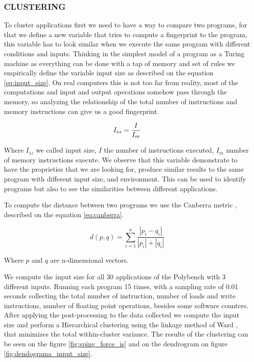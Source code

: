 \subsubsection{CLUSTERING}

To cluster applications first we need to have a way to compare two programs, for that we define a new variable that tries to compute a fingerprint to the program, this variable has to look similar when we execute the same program with different conditions and inputs. Thinking in the simplest model of a program as a Turing machine as everything can be done with a tap of memory and set of rules we empirically define the variable input size as described on the equation \ref{eq:input_size}. On real computers this is not too far from reality, most of the computations and input and output operations somehow pass through the memory, so analyzing the relationship of the total number of instructions and memory instructions can give us a good fingerprint.

\begin{equation}
	I_{sz} = \frac{I}{I_{m}} \\
	\label{eq:input_size}
\end{equation}

Where $I_{sz}$ we called input size, $I$ the number of instructions executed, $I_m$ number of memory instructions execute. We observe that this variable demonstrate to have the proprieties that we are looking for, produce similar results to the same program with different input size, and environment. This can be used to identify programs but also to see the similarities between different applications.

To compute the distance between two programs we use the Canberra metric \cite{Jurman2009CanberraLists}, described on the equation \ref{eq:canberra}.

\begin{equation}
	d(p,q)= \sum_{i=1}^{n}{\frac{|p_i-q_i|}{|p_i|+|q_i|}}
	\label{eq:canberra}
\end{equation}

Where $p$ and $q$ are n-dimensional vectors.

We compute the input size for all 30 applications of the Polybench with 3 different inputs. Running each program 15 times, with a sampling rate of 0.01 seconds collecting the total number of instruction, number of loads and write instructions, number of floating point operations, besides some software counters. After applying the post-processing to the data collected we compute the input size and perform a Hierarchical clustering using the linkage method of Ward \cite{Murtagh2011WardsAlgorithm}, that minimizes the total within-cluster variance. The results of the clustering can be seen on the figure \ref{fig:sping_force_is} and on the dendrogram on figure \ref{fig:dendograma_input_size}.

